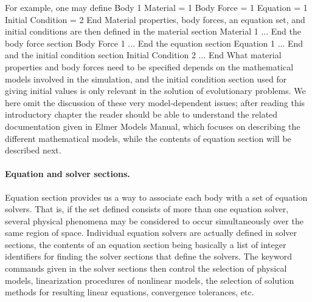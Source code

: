 For example, one may define 
\ttbegin
Body 1
  Material = 1
  Body Force = 1
  Equation = 1
  Initial Condition = 2
End
\ttend
Material properties, body forces, an equation set, and initial conditions 
are then defined in the material section 
\ttbegin
Material 1
  ...
End
\ttend
the body force section
\ttbegin
Body Force 1
  ...
End
\ttend
the equation section
\ttbegin
Equation 1
  ...
End
\ttend
and the initial condition section
\ttbegin
Initial Condition 2
  ...
End
\ttend
What material properties and body forces need to be specified depends on the mathematical models 
involved in the simulation, and the initial condition section used for giving initial values is only relevant
in the solution of evolutionary problems. We here omit the discussion of these very model-dependent 
issues; after reading this introductory chapter the reader should be able to understand
the related documentation given in Elmer Models Manual, which focuses on describing the different mathematical models,
while the contents of equation section will be described next.




\paragraph{Equation and solver sections.}
Equation section provides us a way to associate each body with a set of equation solvers. 
That is, if the set defined consists of more than one equation solver, several physical phenomena 
may be considered to occur simultaneously over the same region of space.
Individual equation solvers are actually defined in solver sections, the contents of an equation section
being basically a list of integer identifiers for finding the solver sections that define the solvers.
The keyword commands given in the solver sections then control the selection of physical models, 
linearization procedures of nonlinear models, 
the selection of solution methods for resulting linear equations, convergence tolerances, etc.  

